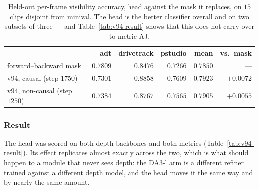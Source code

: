 \documentclass[11pt,a4paper]{article}
\begin{document}
\begin{table}[h]
\centering
\caption{Held-out per-frame visibility accuracy, head against the mask it replaces, on $15$ clips
disjoint from minival. The head is the better classifier overall and on two subsets of three ---
and Table~\ref{tab:v94-result} shows that this does not carry over to metric-AJ.}
\label{tab:v94-gate}
\begin{tabular}{lrrrrr}
\toprule
 & adt & drivetrack & pstudio & mean & vs.\ mask \\
\midrule
forward--backward mask & $\mathbf{0.7809}$ & $0.8476$ & $0.7266$ & $0.7850$ & --- \\
v94, causal (step $1750$) & $0.7301$ & $\mathbf{0.8858}$ & $\mathbf{0.7609}$ & $\mathbf{0.7923}$ & $+0.0072$ \\
v94, non-causal (step $1250$) & $0.7384$ & $0.8767$ & $0.7565$ & $0.7905$ & $+0.0055$ \\
\bottomrule
\end{tabular}
\end{table}

\subsubsection{Result}
\label{sec:v94-result}
The head was scored on both depth backbones and both metrics (Table~\ref{tab:v94-result}). Its
effect replicates almost exactly across the two, which is what should happen to a module that
never sees depth: the DA3-l arm is a different refiner trained against a different depth model,
and the head moves it the same way and by nearly the same amount.
\end{document}

